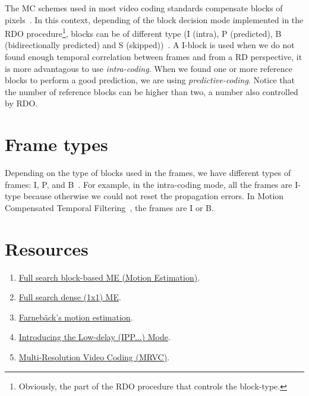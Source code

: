 The MC schemes used in most video coding standards compensate blocks
of pixels~\cite{vruiz__ME}. In this context, depending of the block
decision mode implemented in the RDO procedure\footnote{Obviously, the
  part of the RDO procedure that controls the block-type.}, blocks can
be of different type (I (intra), P (predicted), B (bidirectionally
predicted) and S (skipped))~\cite{vruiz__MC}. A I-block is used when
we do not found enough temporal correlation between frames and from a
RD perspective, it is more advantagous to use
\emph{intra-coding}. When we found one or more reference blocks to
perform a good prediction, we are using
\emph{predictive-coding}. Notice that the number of reference blocks
can be higher than two, a number also controlled by RDO.

\section{Frame types}

Depending on the type of blocks used in the frames, we have different
types of frames: I, P, and B~\cite{vruiz__MC}. For example, in the
intra-coding mode, all the frames are I-type because otherwise we
could not reset the propagation errors. In Motion Compensated Temporal
Filtering~\cite{vruiz__MCTF}, the frames are I or B.

\section{Resources}
\begin{enumerate}
\item \href{https://github.com/vicente-gonzalez-ruiz/motion_estimation/blob/main/src/motion_estimation/full_search_block_ME.ipynb}{Full search block-based ME (Motion Estimation)}.
\item \href{https://github.com/vicente-gonzalez-ruiz/motion_estimation/blob/main/src/motion_estimation/full_search_dense_ME.ipynb}{Full search dense (1x1) ME}.
\item \href{https://github.com/vicente-gonzalez-ruiz/motion_estimation/blob/main/src/motion_estimation/farneback_ME.ipynb}{Farnebäck's motion estimation}.
\item \href{https://github.com/vicente-gonzalez-ruiz/motion_compensation/blob/master/introducing_IPPP.ipynb}{Introducing the Low-delay (IPP...) Mode}.
\item \href{https://github.com/Sistemas-Multimedia/MRVC}{Multi-Resolution Video Coding (MRVC)}.
\end{enumerate}

